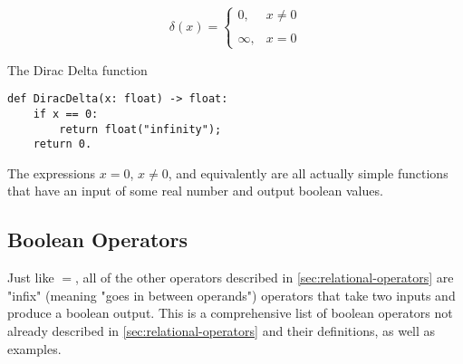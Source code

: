 \begin{equation}\label{func:dirac}
\delta(x)=
\begin{cases}
0,&x\ne 0\\\\
\infty,&x=0
\end{cases}
\end{equation}

\begin{listing}[h]
\caption{The Dirac Delta function}\label{code:dirac}
\begin{verbatim}
def DiracDelta(x: float) -> float:
	if x == 0:
		return float("infinity");
	return 0.
\end{verbatim}
\end{listing}

The expressions $x=0$, $x\ne0$, and equivalently  are all actually simple functions that have an input of some real number and output boolean values.

\subsection{Boolean Operators}
Just like $=$, all of the other operators described in \ref{sec:relational-operators} are "infix" (meaning "goes in between operands") operators that take two inputs and produce a boolean output.
This is a comprehensive list of boolean operators not already described in \ref{sec:relational-operators} and their definitions, as well as examples.
